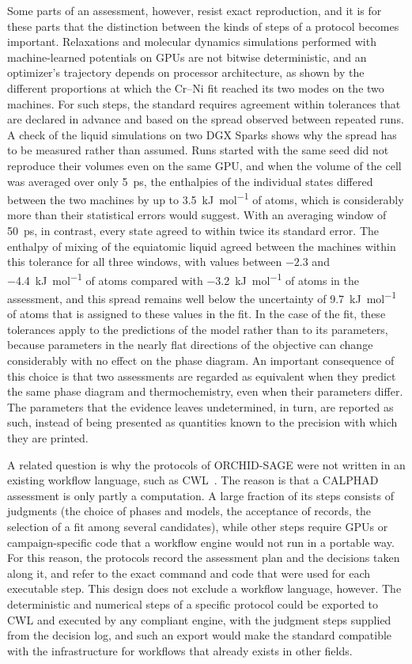 Some parts of an assessment, however, resist exact reproduction, and it is for these parts that the distinction between the kinds of steps of a protocol becomes important. Relaxations and molecular dynamics simulations performed with machine-learned potentials on GPUs are not bitwise deterministic, and an optimizer's trajectory depends on processor architecture, as shown by the different proportions at which the Cr--Ni fit reached its two modes on the two machines. For such steps, the standard requires agreement within tolerances that are declared in advance and based on the spread observed between repeated runs. A check of the liquid simulations on two DGX Sparks shows why the spread has to be measured rather than assumed. Runs started with the same seed did not reproduce their volumes even on the same GPU, and when the volume of the cell was averaged over only \qty{5}{\ps}, the enthalpies of the individual states differed between the two machines by up to \qty{3.5}{\kilo\joule\per\mole} of atoms, which is considerably more than their statistical errors would suggest. With an averaging window of \qty{50}{\ps}, in contrast, every state agreed to within twice its standard error. The enthalpy of mixing of the equiatomic liquid agreed between the machines within this tolerance for all three windows, with values between $-2.3$ and \qty{-4.4}{\kilo\joule\per\mole} of atoms compared with \qty{-3.2}{\kilo\joule\per\mole} of atoms in the assessment, and this spread remains well below the uncertainty of \qty{9.7}{\kilo\joule\per\mole} of atoms that is assigned to these values in the fit. In the case of the fit, these tolerances apply to the predictions of the model rather than to its parameters, because parameters in the nearly flat directions of the objective can change considerably with no effect on the phase diagram. An important consequence of this choice is that two assessments are regarded as equivalent when they predict the same phase diagram and thermochemistry, even when their parameters differ. The parameters that the evidence leaves undetermined, in turn, are reported as such, instead of being presented as quantities known to the precision with which they are printed.

A related question is why the protocols of ORCHID-SAGE were not written in an existing workflow language, such as CWL~\cite{crusoe2022cwl}. The reason is that a CALPHAD assessment is only partly a computation. A large fraction of its steps consists of judgments (the choice of phases and models, the acceptance of records, the selection of a fit among several candidates), while other steps require GPUs or campaign-specific code that a workflow engine would not run in a portable way. For this reason, the protocols record the assessment plan and the decisions taken along it, and refer to the exact command and code that were used for each executable step. This design does not exclude a workflow language, however. The deterministic and numerical steps of a specific protocol could be exported to CWL and executed by any compliant engine, with the judgment steps supplied from the decision log, and such an export would make the standard compatible with the infrastructure for workflows that already exists in other fields.

